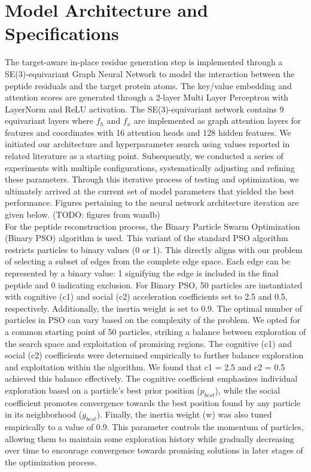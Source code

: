 \section{Model Architecture and Specifications}
The target-aware in-place residue generation step is implemented through a SE(3)-equivariant Graph Neural Network to model the interaction between the peptide residuals and the target protein atoms. The key/value embedding and attention scores are generated through a 2-layer Multi Layer Perceptron with LayerNorm and ReLU activation.
The SE(3)-equivariant network contains 9 equivariant layers where $f_h$ and $f_x$ are implemented as graph attention layers for features and coordinates with 16 attention heads and 128 hidden features. We initiated our architecture and hyperparameter search using values reported in related literature \cite{guan20233d} as a starting point. Subsequently, we conducted a series of experiments with multiple configurations, systematically adjusting and refining these parameters. Through this iterative process of testing and optimization, we ultimately arrived at the current set of model parameters that yielded the best performance. Figures pertaining to the neural network architecture iteration are given below. (TODO: figures from wandb) \\

For the peptide reconstruction process, the Binary Particle Swarm Optimization (Binary PSO) algorithm is used. This variant of the standard PSO algorithm restricts particles to binary values (0 or 1). This directly aligns with our problem of selecting a subset of edges from the complete edge space. Each edge can be represented by a binary value: 1 signifying the edge is included in the final peptide and 0 indicating exclusion. For Binary PSO, 50 particles are instantiated with cognitive (c1) and social (c2) acceleration coefficients set to 2.5 and 0.5, respectively. Additionally, the inertia weight is set to 0.9.
The optimal number of particles in PSO can vary based on the complexity of the problem. We opted for a common starting point of 50 particles, striking a balance between exploration of the search space and exploitation of promising regions. The cognitive (c1) and social (c2) coefficients were determined empirically to further balance exploration and exploitation within the algorithm. We found that c1 = 2.5 and c2 = 0.5 achieved this balance effectively. The cognitive coefficient emphasizes individual exploration based on a particle's best prior position ($p_{best}$), while the social coefficient promotes convergence towards the best position found by any particle in its neighborhood ($g_{best}$). Finally, the inertia weight (w) was also tuned empirically to a value of 0.9. This parameter controls the momentum of particles, allowing them to maintain some exploration history while gradually decreasing over time to encourage convergence towards promising solutions in later stages of the optimization process.

